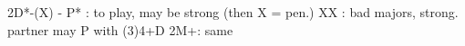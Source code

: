 2D*-(X) -
P* : to play, may be strong (then X = pen.)
XX : bad majors, strong. partner may P with (3)4+D
2M+: same